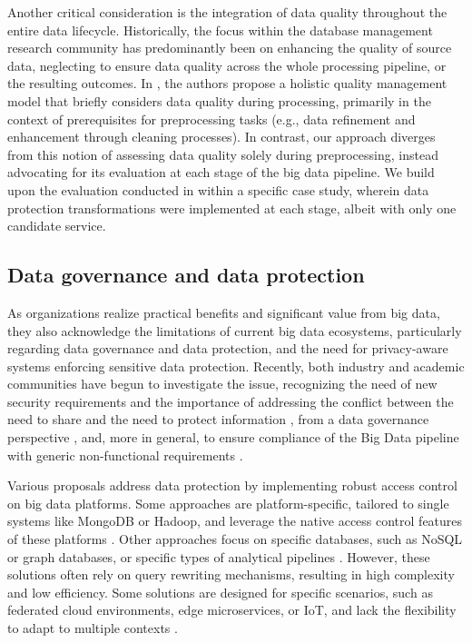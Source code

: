 Another critical consideration is the integration of data quality throughout the entire data lifecycle. Historically, the focus within the database management research community has predominantly been on enhancing the quality of source data, neglecting to ensure data quality across the whole processing pipeline, or the resulting outcomes. In \cite{BigDataQaulitySurvey}, %
the authors propose a holistic quality management model that briefly considers data quality during processing, primarily in the context of prerequisites for preprocessing tasks (e.g., data refinement and enhancement through cleaning processes). In contrast, our approach diverges from this notion of assessing data quality solely during preprocessing, instead advocating for its evaluation at each stage of the big data pipeline. We build upon the evaluation conducted in \cite{impetusPaper} within a specific case study, wherein data protection transformations were implemented at each stage, albeit with only one candidate service.

\subsection{Data governance and data protection}\label{sec:datagov}

As organizations realize practical benefits and significant value from big data, they also acknowledge the limitations of current big data ecosystems, particularly regarding data governance and data protection, and the need for privacy-aware systems enforcing sensitive data protection. Recently, both industry and academic communities have begun to investigate the issue, recognizing the need of new security requirements \cite{Colombo:JournCybersec:2019} and the importance of addressing the conflict between the need to share and the need to protect information \cite{balancingact,VANDENBROEK2018330,balancingInMedicine,needtobalance,dataProtection}, from a data governance perspective \cite{al2018exploring,aissa2020decide}, and, more in general, to ensure compliance of the Big Data pipeline with generic non-functional requirements \cite{ABBJ.ICWS2022,ABHKKS.BD2023}.

Various proposals address data protection by implementing robust access control on big data platforms. Some approaches are platform-specific, tailored to single systems like MongoDB or Hadoop, and leverage the native access control features of these platforms \cite{rathore2017hadoop,anisetti2018privacy,FederationAC:Journ:2020,Sandhu:ABAC:2018,GuptaSandu:2017}. Other approaches focus on specific databases, such as NoSQL or graph databases, or specific types of analytical pipelines  \cite{AConGraphDB:2021, AConMongoDB:2022, ABACforHBase:2019}. However, these solutions often rely on query rewriting mechanisms, resulting in high complexity and low efficiency. Some solutions are designed for specific scenarios, such as federated cloud environments, edge microservices, or IoT, and lack the flexibility to adapt to multiple contexts \cite{MultipartyAC:2019, IoTSecurity}.

